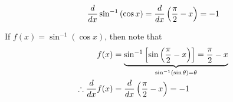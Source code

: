 \documentclass[14pt,fleqn]{extarticle}
\begin{document}
 
\begin{snippet}
    \correct
    \[ \frac{d}{dx} \sin^{-1} \left(\cos x \right) = \frac{d}{dx} \left(\frac\pi{2} -x \right) = -1\]
    
    \reason
  
  If $f(x) = \sin^{-1} \left(\cos x \right)$, then note that 
  \begin{align}
	f(x) &= \underbrace{\sin^{-1} \left[\sin \left(\frac\pi{2}-x \right) \right] = \frac\pi{2}- x}_{\sin^{-1} \left(\sin\theta \right) = \theta} \\
	\therefore \frac{d}{dx} f(x) &= \frac{d}{dx} \left(\frac\pi{2}-x \right) = -1
\end{align}
\end{snippet} 
\end{document}
